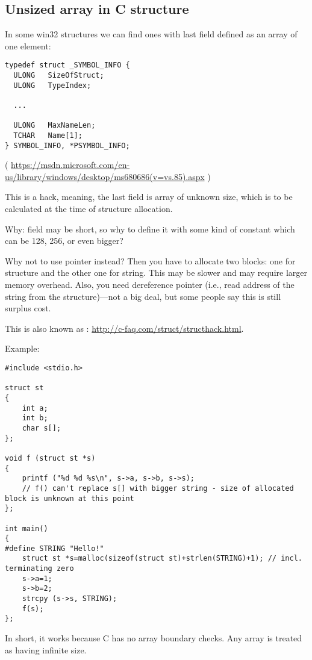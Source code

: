 \subsection{Unsized array in C structure}

In some win32 structures we can find ones with last field defined as an array of one element:

\begin{lstlisting}[style=customc]
typedef struct _SYMBOL_INFO {
  ULONG   SizeOfStruct;
  ULONG   TypeIndex;
  
  ...

  ULONG   MaxNameLen;
  TCHAR   Name[1];
} SYMBOL_INFO, *PSYMBOL_INFO;
\end{lstlisting}

( \url{https://msdn.microsoft.com/en-us/library/windows/desktop/ms680686(v=vs.85).aspx} )

This is a hack, meaning, the last field is array of unknown size,
which is to be calculated at the time of structure allocation.

Why:  field may be short, so why to define it with some kind of 
constant which can be 128, 256, or even bigger?

Why not to use pointer instead? Then you have to allocate two blocks: one for structure and the other one for string.
This may be slower and may require larger memory overhead.
Also, you need dereference pointer (i.e., read address of the string from the structure)---not a big deal, but some
people say this is still surplus cost.

This is also known as : \url{http://c-faq.com/struct/structhack.html}.

Example:

\begin{lstlisting}[style=customc]
#include <stdio.h>

struct st
{
	int a;
	int b;
	char s[];
};

void f (struct st *s)
{
	printf ("%d %d %s\n", s->a, s->b, s->s);
	// f() can't replace s[] with bigger string - size of allocated block is unknown at this point
};

int main()
{
#define STRING "Hello!"
	struct st *s=malloc(sizeof(struct st)+strlen(STRING)+1); // incl. terminating zero
	s->a=1;
	s->b=2;
	strcpy (s->s, STRING);
	f(s);
};
\end{lstlisting}

In short, it works because C has no array boundary checks. Any array is treated as having infinite size.

